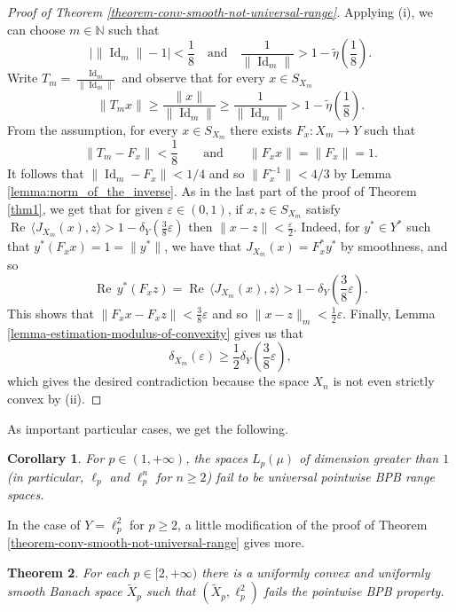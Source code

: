 \documentclass[a4paper,10pt]{amsart}
\theoremstyle{plain}
\newtheorem{theorem}{Theorem}[section]
\newtheorem{corollary}[theorem]{Corollary}
\theoremstyle{definition}
\DeclareMathOperator{\re}{Re\,}
\DeclareMathOperator{\Id}{\mathrm{Id}}
\newcommand{\N}{\mathbb{N}}
\newcommand{\eps}{\varepsilon}
\renewcommand{\geq}{\geqslant}
\begin{document}
\begin{proof}[Proof of Theorem \ref{theorem-conv-smooth-not-universal-range}]
Applying (i), we can choose $m\in \N$ such that
$$
\bigl| \|\Id_m\|-1\bigr|<\frac18 \quad \text{and} \quad \frac{1}{\|\Id_m\|} > 1 -\tilde\eta\left(\frac{1}{8}\right).
$$
Write $T_m=\frac{\Id_m}{\|\Id_m\|}$ and observe that for every $x\in S_{X_m}$
$$
\|T_{m}x\| \geq \frac{\|x\|}{\|\Id_m\|}\geq \frac{1}{\|\Id_m\|} > 1 -\tilde\eta\left(\frac{1}{8}\right).
$$
From the assumption,  for every $x \in S_{X_m}$ there exists $F_x \colon X_m\longrightarrow Y$ such that
$$
\|T_m-F_x\|<\frac{1}{8} \qquad \text{and} \qquad \|F_x x\|=\|F_x\|=1.
$$
It follows that $\|\Id_m - F_x\|<1/4$ and so $\|F_x^{-1}\|<4/3$ by Lemma \ref{lemma:norm_of_the_inverse}. As in the last part of the proof of Theorem \ref{thm1}, we get that for given $\eps\in (0,1)$, if $x,z\in S_{X_m}$ satisfy $\re \langle J_{X_m}(x), z \rangle >1-\delta_{Y}\left(\frac{3}{8}\eps\right)$ then $\|x-z\|<\frac{\eps}{2}$.
Indeed, for $y^*\in Y^*$ such that $y^*(F_x x)=1=\|y^*\|$, we have that $J_{X_m}(x)=F_x^*y^*$ by smoothness, and so
$$
\re y^*(F_x z)=\re \langle J_{X_m}(x), z \rangle >1-\delta_{Y}\left(\frac{3}{8}\eps\right).
$$
This shows that $\|F_x x - F_x z\|<\frac{3}{8}\eps$ and so $\|x-z\|_m<\frac{1}{2}\eps$. Finally, Lemma \ref{lemma-estimation-modulus-of-convexity} gives us that  $$\delta_{X_m}(\eps)\geq \frac{1}{2}\delta_{Y}\left(\frac{3}{8}\eps\right),$$ which gives the desired contradiction because the space $X_n$ is not even strictly convex by (ii).
\end{proof}

As important particular cases, we get the following.

\begin{corollary}\label{corollary-ell_p-is-not-universal-pointwise BPB property-range}
For $p\in (1, +\infty)$, the spaces $L_p(\mu)$ of dimension greater than $1$ (in particular, $\ell_p$ and $\ell_p^n$ for $n\geq 2$) fail to be universal pointwise BPB range spaces.
\end{corollary}

In the case of $Y =  \ell_p^2$ for $p\geq 2$, a little modification of the proof of Theorem \ref{theorem-conv-smooth-not-universal-range} gives more.

\begin{theorem}\label{theorem-ellp2-not-universal-range}
For each $p\in [2, +\infty)$  there is a uniformly convex and uniformly smooth Banach space $\widetilde{X}_p$ such that $(\widetilde{X}_p,\ell_p^2)$ fails the pointwise BPB property.
\end{theorem}
\end{document}
